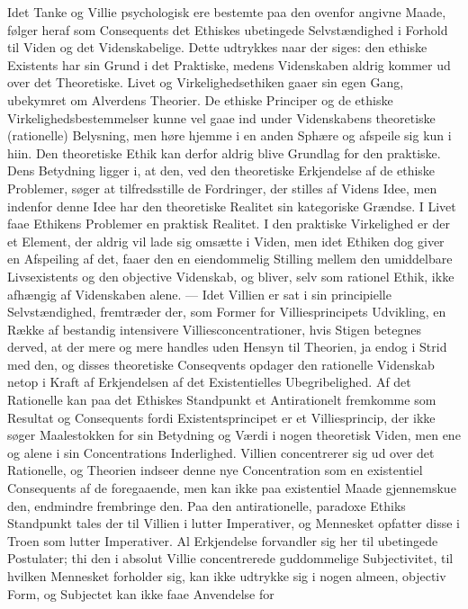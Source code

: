 \documentclass[12pt,a4paper]{book}
\newcommand{\opage}[1]{\marginnote{\footnotesize\textit{[#1]}}}
\begin{document}
Idet Tanke og Villie psychologisk ere bestemte paa den ovenfor angivne Maade, følger heraf
som Consequents det Ethiskes ubetingede Selvstændighed i Forhold til Viden og det
Videnskabelige. Dette udtrykkes naar der siges: den ethiske Existents har sin Grund i det
Praktiske, medens Videnskaben aldrig kommer ud over det Theoretiske. Livet og
Virkelighedsethiken gaaer sin egen Gang, ubekymret om Alverdens Theorier. De ethiske
Principer og de ethiske Virkelighedsbestemmelser kunne vel gaae ind under Videnskabens
theoretiske (rationelle) Belysning, men høre hjemme i en anden Sphære og afspeile sig kun i
hiin. Den theoretiske Ethik kan derfor aldrig blive Grundlag for den praktiske. Dens
Betydning ligger i, at den, ved den theoretiske Erkjendelse af de ethiske Problemer, søger
at tilfredsstille de Fordringer, der stilles af Videns Idee, men indenfor denne Idee har
den theoretiske Realitet sin kategoriske Grændse. I Livet faae Ethikens Problemer en
praktisk Realitet. I den praktiske Virkelighed er der et Element, der aldrig vil lade sig
omsætte i Viden, men idet Ethiken dog giver en Afspeiling af det, faaer den en
eiendommelig Stilling mellem den umiddelbare Livsexistents og den objective Videnskab, og
bliver, selv som rationel Ethik, ikke afhængig af Videnskaben alene. ---
Idet Villien er sat i sin principielle Selvstændighed, fremtræder der, som Former for
Villiesprincipets Udvikling, en Række af bestandig intensivere Villiesconcentrationer, hvis
Stigen betegnes derved, at der mere og mere handles uden Hensyn til Theorien, ja endog i
Strid med den, og disses theoretiske Conseqvents opdager den rationelle Videnskab netop i
Kraft af Erkjendelsen af det Existentielles Ubegribelighed. Af det Rationelle kan paa det
Ethiskes Standpunkt et Antirationelt fremkomme som Resultat og Consequents fordi
Existentsprincipet er et Villiesprincip, der ikke søger Maalestokken for sin Betydning og
Værdi i nogen theoretisk Viden, men ene og alene i sin Concentrations Inderlighed. Villien
concentrerer sig ud over det Rationelle, og Theorien \opage{162}indseer denne nye Concentration som en
existentiel Consequents af de foregaaende, men kan ikke paa existentiel Maade gjennemskue
den, endmindre frembringe den. Paa den antirationelle, paradoxe Ethiks Standpunkt tales der
til Villien i lutter Imperativer, og Mennesket opfatter disse i Troen som lutter
Imperativer. Al Erkjendelse forvandler sig her til ubetingede Postulater; thi den i absolut
Villie concentrerede guddommelige Subjectivitet, til hvilken Mennesket forholder sig, kan
ikke udtrykke sig i nogen almeen, objectiv Form, og Subjectet kan ikke faae Anvendelse for
\end{document}
